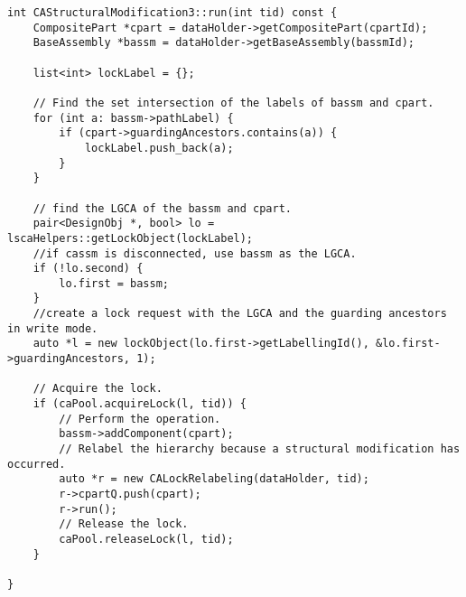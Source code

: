 \begin{lstlisting}[caption={Overall execution of an operation in CALock}, label={lst:overall-execution}]
int CAStructuralModification3::run(int tid) const {
    CompositePart *cpart = dataHolder->getCompositePart(cpartId);
    BaseAssembly *bassm = dataHolder->getBaseAssembly(bassmId);

    list<int> lockLabel = {};

    // Find the set intersection of the labels of bassm and cpart.
    for (int a: bassm->pathLabel) {
        if (cpart->guardingAncestors.contains(a)) {
            lockLabel.push_back(a);
        }
    }

    // find the LGCA of the bassm and cpart.
    pair<DesignObj *, bool> lo = lscaHelpers::getLockObject(lockLabel);
    //if cassm is disconnected, use bassm as the LGCA.
    if (!lo.second) {
        lo.first = bassm;
    }
    //create a lock request with the LGCA and the guarding ancestors in write mode. 
    auto *l = new lockObject(lo.first->getLabellingId(), &lo.first->guardingAncestors, 1);

    // Acquire the lock.
    if (caPool.acquireLock(l, tid)) {
        // Perform the operation.
        bassm->addComponent(cpart);
        // Relabel the hierarchy because a structural modification has occurred.
        auto *r = new CALockRelabeling(dataHolder, tid);
        r->cpartQ.push(cpart);
        r->run();
        // Release the lock.
        caPool.releaseLock(l, tid);
    }

}

\end{lstlisting}